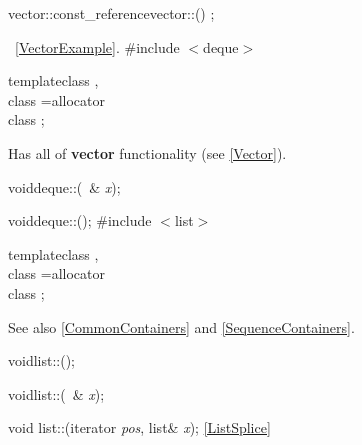 \begin{multicols}{4}
vector::const_reference\enskip vector::() \const;
\fi

\seeExample\ \ref{VectorExample}.
%
 \label{Deque}
%
\#include $<$deque$>$

\begin{templdec}
template\<class \T,\\
\phantemp class \Alloc=allocator\>\\
class ;\\
\end{templdec}

Has all of \textbf{vector} functionality (see \ref{Vector}).

void\enskip  deque::(\const\ \T\& \emph{x});

void\enskip  deque::();
%
 \label{List}
%
\#include $<$list$>$

\begin{templdec}
template\<class \T,\\
\phantemp class \Alloc=allocator\>\\
class ;\\
\end{templdec}

See also \ref{CommonContainers} and \ref{SequenceContainers}.

\iffalse
list::reference\enskip list::\StrongClrBf{front}();

list::const_reference\enskip list::\StrongClrBf{front}() \const;

list::reference\enskip list::\StrongClrBf{back}();

list::const_reference\enskip list::\StrongClrBf{back}() \const;
\fi

void\enskip list::();

void\enskip list::(\const\  \T\& \emph{x});


void \newline
list::(iterator \textit{pos}, 
                           list\TPT\&  \textit{x}); 
\enskip\seeExample\ref{ListSplice}


\end{multicols}
